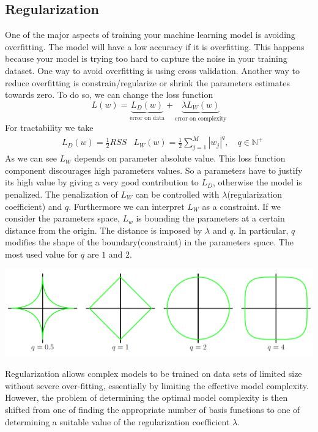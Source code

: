 \documentclass[../main.tex]{subfiles}
\begin{document}
\subsection{Regularization}
One of the major aspects of training your machine learning model is avoiding overfitting. The model will have a low accuracy if it is overfitting. This happens because your model is trying too hard to capture the noise in your training dataset. One way to avoid overfitting is using cross validation. Another way to reduce overfitting is constrain/regularize or shrink the parameters estimates towards zero. To do so, we can change the loss function
\begin{equation}
    L(w)=\underbrace{L_D(w)}_{\text{error on data}}+ \underbrace{\lambda L_W(w)}_{\text{error on complexity}}
\end{equation}
For tractability we take
\begin{align*}
     & L_D(w)=\frac{1}{2}RSS & L_W(w)=\frac{1}{2}\sum_{j=1}^M |w_j|^q, \quad q\in\mathbb{N}^+
\end{align*}
As we can see $L_W$ depends on parameter absolute value. This loss function component discourages high parameters values. So a parameters have to justify its high value by giving a very good contribution to $L_D$, otherwise the model is penalized.
The penalization of $L_W$ can be controlled with $\lambda$(regularization coefficient) and $q$.
Furthermore we can interpret $L_W$ as a constraint. If we consider the parameters space, $L_w$ is bounding the parameters at a certain distance from the origin. The distance is imposed by $\lambda$ and $q$. In particular, $q$ modifies the shape of the boundary(constraint) in the parameters space.
The most used value for $q$ are $1$ and $2$.
\begin{center}
    \includegraphics[scale=0.4]{images/Q_boundaries_regularization.PNG}
\end{center}
Regularization allows complex models to be trained on data sets of limited size
without severe over-fitting, essentially by limiting the effective model complexity.
However, the problem of determining the optimal model complexity is then shifted
from one of finding the appropriate number of basis functions to one of determining
a suitable value of the regularization coefficient $\lambda$.
\end{document}
